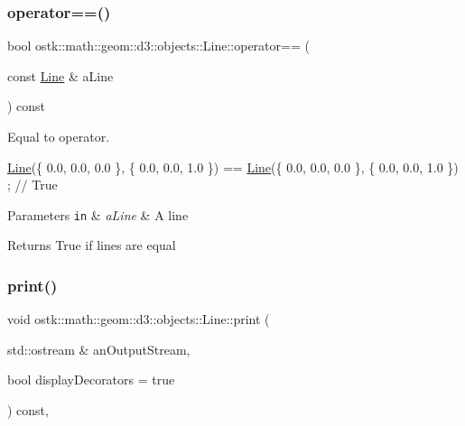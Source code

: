 \subsubsection{\texorpdfstring{operator==()}{operator==()}}
{\footnotesize\ttfamily bool ostk\+::math\+::geom\+::d3\+::objects\+::\+Line\+::operator== (\begin{DoxyParamCaption}\item[{const \hyperlink{classostk_1_1math_1_1geom_1_1d3_1_1objects_1_1_line}{Line} \&}]{a\+Line }\end{DoxyParamCaption}) const}



Equal to operator. 


\begin{DoxyCode}
\hyperlink{classostk_1_1math_1_1geom_1_1d3_1_1objects_1_1_line_a9ebdaaf67a4bd91780808f8683463ebe}{Line}(\{ 0.0, 0.0, 0.0 \}, \{ 0.0, 0.0, 1.0 \}) == \hyperlink{classostk_1_1math_1_1geom_1_1d3_1_1objects_1_1_line_a9ebdaaf67a4bd91780808f8683463ebe}{Line}(\{ 0.0, 0.0, 0.0 \}, \{ 0.0, 0.0, 1.0 \}) ; \textcolor{comment}{// True}
\end{DoxyCode}



\begin{DoxyParams}[1]{Parameters}
\mbox{\tt in}  & {\em a\+Line} & A line \\
\hline
\end{DoxyParams}
\begin{DoxyReturn}{Returns}
True if lines are equal 
\end{DoxyReturn}
\mbox{\label{classostk_1_1math_1_1geom_1_1d3_1_1objects_1_1_line_ad3e7bf31cdde2d265dd9ff644b341f2d}} 
\subsubsection{\texorpdfstring{print()}{print()}}
{\footnotesize\ttfamily void ostk\+::math\+::geom\+::d3\+::objects\+::\+Line\+::print (\begin{DoxyParamCaption}\item[{std\+::ostream \&}]{an\+Output\+Stream,  }\item[{bool}]{display\+Decorators = {\ttfamily true} }\end{DoxyParamCaption}) const\hspace{0.3cm}{\ttfamily [override]}, {\ttfamily [virtual]}}



